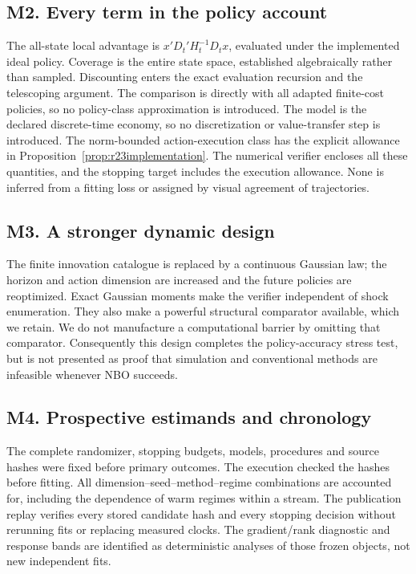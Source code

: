 \subsection*{M2. Every term in the policy account}
The all-state local advantage is $x'D_t'H_t^{-1}D_tx$, evaluated under the
implemented ideal policy. Coverage is the entire state space, established
algebraically rather than sampled. Discounting enters the exact evaluation
recursion and the telescoping argument. The comparison is directly with all
adapted finite-cost policies, so no policy-class approximation is introduced.
The model is the declared discrete-time economy, so no discretization or
value-transfer step is introduced. The norm-bounded action-execution class
has the explicit allowance in Proposition~\ref{prop:r23implementation}.
The numerical verifier encloses all these quantities, and the stopping
target includes the execution allowance. None is inferred from a fitting
loss or assigned by visual agreement of trajectories.

\subsection*{M3. A stronger dynamic design}
The finite innovation catalogue is replaced by a continuous Gaussian law;
the horizon and action dimension are increased and the future policies are
reoptimized. Exact Gaussian moments make the verifier independent of shock
enumeration. They also make a powerful structural comparator available,
which we retain. We do not manufacture a computational barrier by omitting
that comparator. Consequently this design completes the policy-accuracy
stress test, but is not presented as proof that simulation and conventional
methods are infeasible whenever NBO succeeds.

\subsection*{M4. Prospective estimands and chronology}
The complete randomizer, stopping budgets, models, procedures and source
hashes were fixed before primary outcomes. The execution checked the hashes
before fitting. All dimension--seed--method--regime combinations are
accounted for, including the dependence of warm regimes within a stream.
The publication replay verifies every stored candidate hash and every
stopping decision without rerunning fits or replacing measured clocks.
The gradient/rank diagnostic and response bands are identified as
deterministic analyses of those frozen objects, not new independent fits.

